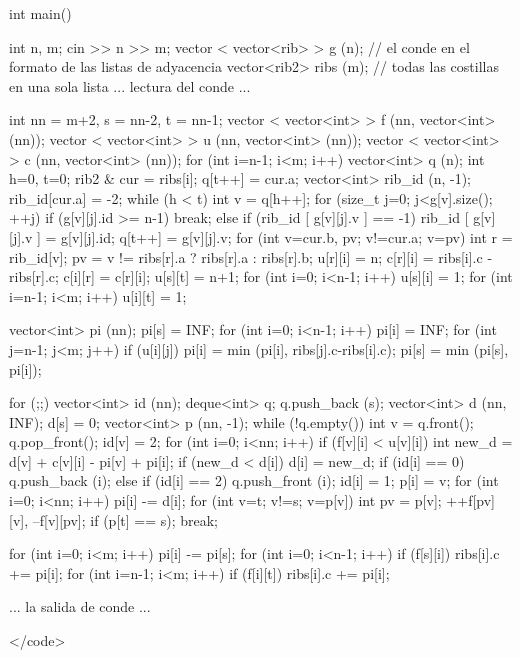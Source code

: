 int main() {

int n, m;
cin >> n >> m;
vector < vector<rib> > g (n); // el conde en el formato de las listas de adyacencia
vector<rib2> ribs (m); // todas las costillas en una sola lista
... lectura del conde ...

int nn = m+2, s = nn-2, t = nn-1;
vector < vector<int> > f (nn, vector<int> (nn));
vector < vector<int> > u (nn, vector<int> (nn));
vector < vector<int> > c (nn, vector<int> (nn));
for (int i=n-1; i<m; i++) {
vector<int> q (n);
int h=0, t=0;
rib2 & cur = ribs[i];
q[t++] = cur.a;
vector<int> rib_id (n, -1);
rib_id[cur.a] = -2;
while (h < t) {
int v = q[h++];
for (size_t j=0; j<g[v].size(); ++j)
if (g[v][j].id >= n-1)
break;
else if (rib_id [ g[v][j].v ] == -1) {
rib_id [ g[v][j].v ] = g[v][j].id;
q[t++] = g[v][j].v;
}
}
for (int v=cur.b, pv; v!=cur.a; v=pv) {
int r = rib_id[v];
pv = v != ribs[r].a ? ribs[r].a : ribs[r].b;
u[r][i] = n;
c[r][i] = ribs[i].c - ribs[r].c;
c[i][r] = c[r][i];
}
}
u[s][t] = n+1;
for (int i=0; i<n-1; i++)
u[s][i] = 1;
for (int i=n-1; i<m; i++)
u[i][t] = 1;

vector<int> pi (nn);
pi[s] = INF;
for (int i=0; i<n-1; i++) {
pi[i] = INF;
for (int j=n-1; j<m; j++)
if (u[i][j])
pi[i] = min (pi[i], ribs[j].c-ribs[i].c);
pi[s] = min (pi[s], pi[i]);
}

for (;;) {
vector<int> id (nn);
deque<int> q;
q.push_back (s);
vector<int> d (nn, INF);
d[s] = 0;
vector<int> p (nn, -1);
while (!q.empty()) {
int v = q.front(); q.pop_front();
id[v] = 2;
for (int i=0; i<nn; i++)
if (f[v][i] < u[v][i]) {
int new_d = d[v] + c[v][i] - pi[v] + pi[i];
if (new_d < d[i]) {
d[i] = new_d;
if (id[i] == 0)
q.push_back (i);
else if (id[i] == 2)
q.push_front (i);
id[i] = 1;
p[i] = v;
}
}
}
for (int i=0; i<nn; i++)
pi[i] -= d[i];
for (int v=t; v!=s; v=p[v]) {
int pv = p[v];
++f[pv][v], --f[v][pv];
}
if (p[t] == s); break;
}

for (int i=0; i<m; i++)
pi[i] -= pi[s];
for (int i=0; i<n-1; i++)
if (f[s][i])
ribs[i].c += pi[i];
for (int i=n-1; i<m; i++)
if (f[i][t])
ribs[i].c += pi[i];

... la salida de conde ...

}</code>